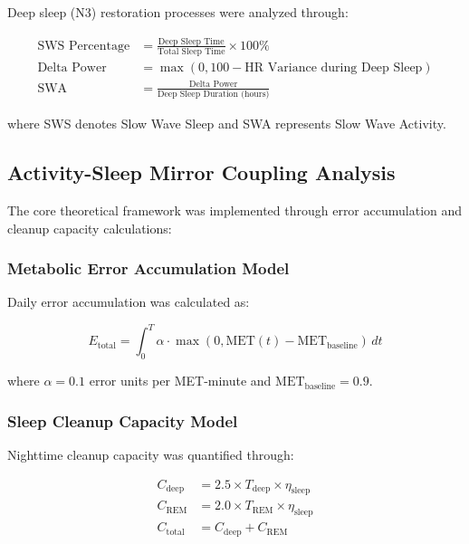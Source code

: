 \documentclass[twocolumn]{article}
\begin{document}
Deep sleep (N3) restoration processes were analyzed through:

\begin{align}
\text{SWS Percentage} &= \frac{\text{Deep Sleep Time}}{\text{Total Sleep Time}} \times 100\% \\
\text{Delta Power} &= \max(0, 100 - \text{HR Variance during Deep Sleep}) \\
\text{SWA} &= \frac{\text{Delta Power}}{\text{Deep Sleep Duration (hours)}}
\end{align}

where SWS denotes Slow Wave Sleep and SWA represents Slow Wave Activity.

\subsection{Activity-Sleep Mirror Coupling Analysis}

The core theoretical framework was implemented through error accumulation and cleanup capacity calculations:

\subsubsection{Metabolic Error Accumulation Model}

Daily error accumulation was calculated as:

\begin{equation}
E_{\text{total}} = \int_0^{T} \alpha \cdot \max(0, \text{MET}(t) - \text{MET}_{\text{baseline}}) \, dt
\label{eq:error_accumulation}
\end{equation}

where $\alpha = 0.1$ error units per MET-minute and $\text{MET}_{\text{baseline}} = 0.9$.

\subsubsection{Sleep Cleanup Capacity Model}

Nighttime cleanup capacity was quantified through:

\begin{align}
C_{\text{deep}} &= 2.5 \times T_{\text{deep}} \times \eta_{\text{sleep}} \\
C_{\text{REM}} &= 2.0 \times T_{\text{REM}} \times \eta_{\text{sleep}} \\
C_{\text{total}} &= C_{\text{deep}} + C_{\text{REM}}
\end{align}
\end{document}
